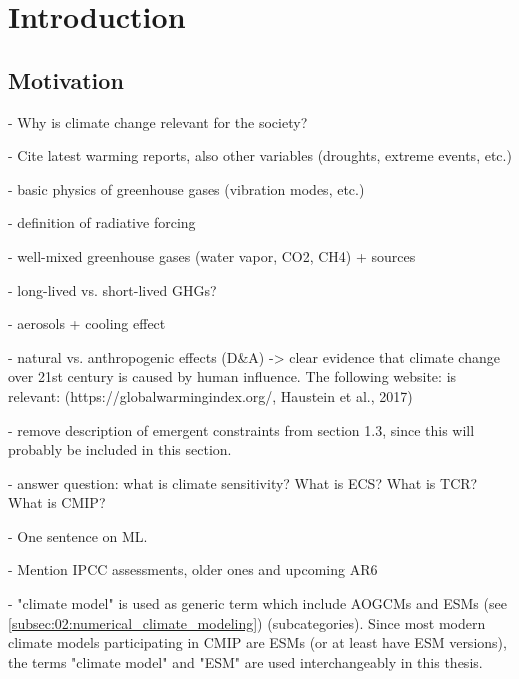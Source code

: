 


\chapter{Introduction}
\label{ch:01:introduction}


\section{Motivation}
\label{sec:01:motivation}

- Why is climate change relevant for the society?

- Cite latest warming reports, also other variables (droughts, extreme events,
etc.)

- basic physics of greenhouse gases (vibration modes, etc.)

- definition of radiative forcing

- well-mixed greenhouse gases (water vapor, CO2, CH4) + sources

- long-lived vs. short-lived GHGs?

- aerosols + cooling effect

- natural vs. anthropogenic effects (D\&A) -> clear evidence that climate
change over 21st century is caused by human influence. The following website:
is relevant: (https://globalwarmingindex.org/, Haustein et al., 2017)

- remove description of emergent constraints from section 1.3, since this will
probably be included in this section.

- answer question: what is climate sensitivity? What is \ac{ECS}? What is
\ac{TCR}? What is \ac{CMIP}?

- One sentence on \ac{ML}.

- Mention IPCC assessments, older ones and upcoming AR6

- "climate model" is used as generic term which include \acp{AOGCM} and
\acp{ESM} (see \cref{subsec:02:numerical_climate_modeling}) (subcategories).
Since most modern climate models participating in CMIP are \acp{ESM} (or at
least have \ac{ESM} versions), the terms "climate model" and "ESM" are used
interchangeably in this thesis.


